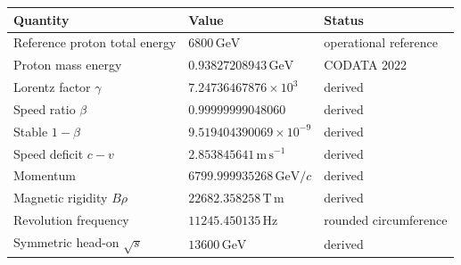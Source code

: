 \begin{tabularx}{\linewidth}{@{}Y L{40mm} L{31mm}@{}}
\toprule
Quantity & Value & Status \\
\midrule
Reference proton total energy & \(6800\,\mathrm{GeV}\) & operational reference \\
Proton mass energy & \(0.93827208943\,\mathrm{GeV}\) & CODATA 2022 \\
Lorentz factor \(\gamma\) & \(7.24736467876\times 10^{3}\) & derived \\
Speed ratio \(\beta\) & \(0.99999999048060\) & derived \\
Stable \(1-\beta\) & \(9.519404390069\times 10^{-9}\) & derived \\
Speed deficit \(c-v\) & \(2.853845641\,\mathrm{m\,s^{-1}}\) & derived \\
Momentum & \(6799.999935268\,\mathrm{GeV}/c\) & derived \\
Magnetic rigidity \(B\rho\) & \(22682.358258\,\mathrm{T\,m}\) & derived \\
Revolution frequency & \(11245.450135\,\mathrm{Hz}\) & rounded circumference \\
Symmetric head-on \(\sqrt{s}\) & \(13600\,\mathrm{GeV}\) & derived \\
\bottomrule
\end{tabularx}
